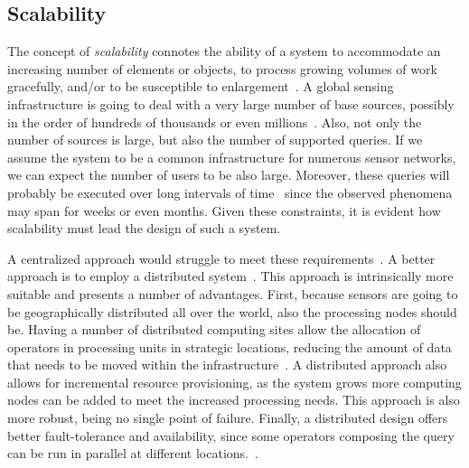 \subsection{Scalability}
The concept of \emph{scalability} connotes the ability of a system to accommodate an increasing number of elements or objects, to
process growing volumes of work gracefully, and/or to be susceptible to enlargement~\cite{scalability}.
A global sensing infrastructure is going to deal with a very large number of base sources, possibly in the order of
hundreds of thousands or even millions~\cite{dependable-is-sensing, mortar-short}. Also, not only the number of sources is large, but also the number of supported queries. 
If we assume the system to be a common infrastructure for numerous sensor networks, we can expect the number of users 
to be also large. Moreover, these queries will probably be executed over long intervals of time~\cite{stream, irisnet} since 
the observed phenomena may span for weeks or even months. Given these constraints, it is evident how scalability must
lead the design of such a system. 

A centralized approach would struggle to meet these requirements~\cite{stream}. A better approach is to employ a
distributed system~\cite{irisnet, borealis-design, mortar-long}.  This approach
is intrinsically more suitable and presents a number of advantages. First, because sensors are going to be geographically
distributed all over the world, also the processing nodes should be. Having a number of distributed computing sites allow the allocation of operators in
processing units in strategic locations, reducing the amount of data that needs to be moved within the
infrastructure~\cite{sbon, placement_strategies}.
A distributed approach also allows for incremental resource provisioning, as the system grows more computing nodes can
be added to meet the increased processing needs. This approach is also more robust, being no single point of failure.
Finally, a distributed design offers better fault-tolerance and availability, since some operators composing the query
can be run in parallel at different locations.~\cite{borealis-fault_tolerance, borealis-fast_and_ha, borealis-fast_and_reliable}.

